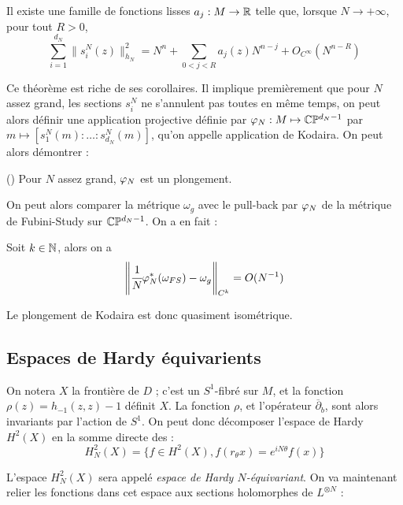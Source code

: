 \begin{theorem}[Zelditch] Il existe une famille de fonctions lisses $a_j : M \to \mathbb{R}$ telle que, lorsque $N \to +\infty$, pour tout $R>0$,  
	\begin{equation*}
	\sum_{i=1}^{d_N}\|s^N_i(z)\|^2_{h_N} = N^n + \sum_{0 < j < R} a_j(z)N^{n-j} + O_{C^{\infty}}(N^{n-R})
	\end{equation*}
\end{theorem}

Ce théorème est riche de ses corollaires. Il implique premièrement que pour $N$ assez grand, les sections $s^N_i$ ne s'annulent pas toutes en même temps, on peut alors définir une application projective définie par $\varphi_N : M \mapsto \mathbb{C}\mathbb{P}^{d_N-1}$ par $m \mapsto [s^N_1(m) : \ldots : s^N_{d_N}(m)]$, qu'on appelle application de Kodaira. On peut alors démontrer :
\begin{theorem}[Kodaira] (\cite{fritzsche}) Pour $N$ assez grand, $\varphi_N$ est un plongement. \end{theorem}

On peut alors comparer la métrique $\omega_g$ avec le pull-back par $\varphi_N$ de la métrique de Fubini-Study sur $\mathbb{C}\mathbb{P}^{d_N-1}$. On a en fait :

\begin{theorem}[Tian] \cite{tian1990set}Soit $k \in \mathbb{N}$, alors on a \begin{equation*}
\left\|\cfrac1N \varphi_N^*(\omega_{FS}) - \omega_g \right\|_{C^{k}} = O(N^{-1})
\end{equation*}\end{theorem}

Le plongement de Kodaira est donc quasiment isométrique.

\subsection{Espaces de Hardy équivarients}

On notera $X$ la frontière de $D$ ; c'est un $S^1$-fibré sur $M$, et la fonction $\rho(z)=h_{-1}(z,z)-1$ définit $X$. La fonction $\rho$, et l'opérateur $\overline{\partial}_b$, sont alors invariants par l'action de $S^1$. On peut donc décomposer l'espace de Hardy $H^2(X)$ en la somme directe des :
\begin{equation*}
	H^2_N(X)=\{f \in H^2(X), f(r_{\theta}x) = e^{iN\theta}f(x)\}
\end{equation*}

L'espace $H^2_N(X)$ sera appelé \emph{espace de Hardy $N$-équivariant}. On va maintenant relier les fonctions dans cet espace aux sections holomorphes de $L^{\otimes N}$ :

